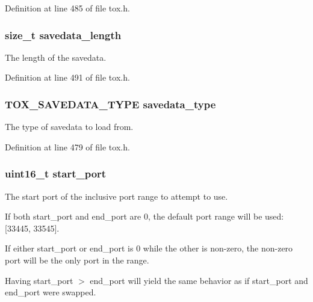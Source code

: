 Definition at line 485 of file tox.\+h.

\hypertarget{struct_tox___options_a56c7956bddcb0d100c54e426b6e5f3ed}{
\subsubsection[{savedata\+\_\+length}]{\setlength{\rightskip}{0pt plus 5cm}size\+\_\+t savedata\+\_\+length}}\label{struct_tox___options_a56c7956bddcb0d100c54e426b6e5f3ed}
The length of the savedata. 

Definition at line 491 of file tox.\+h.

\hypertarget{struct_tox___options_a825cfabf7be0224b12d09c8b1f5cbed6}{
\subsubsection[{savedata\+\_\+type}]{\setlength{\rightskip}{0pt plus 5cm}T\+O\+X\+\_\+\+S\+A\+V\+E\+D\+A\+T\+A\+\_\+\+T\+Y\+P\+E savedata\+\_\+type}}\label{struct_tox___options_a825cfabf7be0224b12d09c8b1f5cbed6}
The type of savedata to load from. 

Definition at line 479 of file tox.\+h.

\hypertarget{struct_tox___options_aa2de2e9258608a29877ef5d5610ea8f7}{
\subsubsection[{start\+\_\+port}]{\setlength{\rightskip}{0pt plus 5cm}uint16\+\_\+t start\+\_\+port}}\label{struct_tox___options_aa2de2e9258608a29877ef5d5610ea8f7}
The start port of the inclusive port range to attempt to use.

If both start\+\_\+port and end\+\_\+port are 0, the default port range will be used\+: \mbox{[}33445, 33545\mbox{]}.

If either start\+\_\+port or end\+\_\+port is 0 while the other is non-\/zero, the non-\/zero port will be the only port in the range.

Having start\+\_\+port $>$ end\+\_\+port will yield the same behavior as if start\+\_\+port and end\+\_\+port were swapped. 

